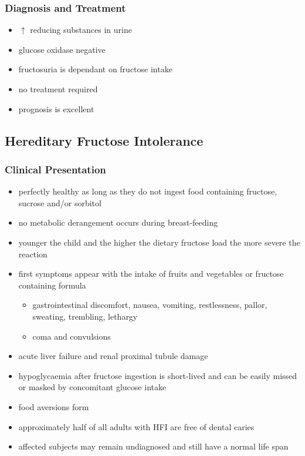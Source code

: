 \documentclass[12pt]{scrartcl}
\begin{document}
\subsubsection{Diagnosis and Treatment}
\label{sec:orgbb45fa2}
\begin{itemize}
\item \(\uparrow\) reducing substances in urine
\item glucose oxidase negative
\item fructosuria is dependant on fructose intake
\item no treatment required
\item prognosis is excellent
\end{itemize}

\subsection{Hereditary Fructose Intolerance}
\label{sec:org192b3e6}
\subsubsection{Clinical Presentation}
\label{sec:org065891e}
\begin{itemize}
\item perfectly healthy as long as they do not ingest food containing
fructose, sucrose and/or sorbitol
\item no metabolic derangement occurs during breast-feeding
\item younger the child and the higher the dietary fructose load the more
severe the reaction
\item first symptoms appear with the intake of fruits and vegetables or
fructose containing formula
\begin{itemize}
\item gastrointestinal discomfort, nausea, vomiting, restlessness,
pallor, sweating, trembling, lethargy
\item coma and convulsions
\end{itemize}
\item acute liver failure and renal proximal tubule damage
\item hypoglycaemia after fructose ingestion is short-lived and can be
easily missed or masked by concomitant glucose intake
\item food aversions form
\item approximately half of all adults with HFI are free of dental caries
\item affected subjects may remain undiagnosed and still have a normal
life span
\end{itemize}
\end{document}
